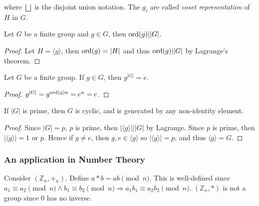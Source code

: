 \documentclass[a4paper]{article}
\begin{document}
    where $ \bigsqcup  $ is the disjoint union notation. The $g_i$ are called \textit{coset representation} of $H$ in $G$.
    \begin{corollary}\label{col:3.5}
            Let $G$ be a finite group and $g\in G$, then $ \operatorname{ord}(g)||G| $.
    \end{corollary}
    \begin{proof}
        Let $ H=\langle g \rangle $, then $ \operatorname{ord}(g)=|H| $ and thus $ \operatorname{ord}(g)||G| $ by Lagrange's theorem.
    \end{proof}
    \begin{corollary}\label{col:3.6}
        Let $G$ be a finite group. If $g\in G$, then $ g^{|G|}=e $.
    \end{corollary}
    \begin{proof}
        $ g^{|G|}=g^{\operatorname{ord}(g)n}=e^{n}=e $.
    \end{proof}
    \begin{corollary}\label{col:3.7}
        If $ |G| $ is prime, then $G$ is cyclic, and is generated by any non-identity element.
    \end{corollary}
    \begin{proof}
        Since $ |G|=p $, $p$ is prime, then $ |\langle g \rangle |||G| $ by Lagrange. Since $p$ is prime, then $ |\langle g \rangle |=1 $ or $p$. Hence if $g\neq e$, then $ g,e\in \langle g \rangle  $ so $ |\langle g \rangle |=p $, and thus $ \langle g \rangle =G $.
    \end{proof}
    \subsubsection{An application in Number Theory}
    Consider $ (\mathbb{Z}_n, +_n) $. Define $ a*b=ab\pmod n $. This is well-defined since $ a_1 \equiv a_2\pmod n \land b_1 \equiv b_2 \pmod n \Rightarrow a_1b_1 \equiv a_2b_2\pmod n $. $ (\mathbb{Z}_n, *) $ is not a group since $0$ has no inverse.
\end{document}
